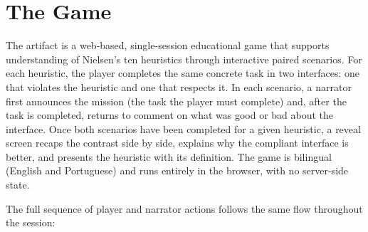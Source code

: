 \section{The Game}
\label{sec:game}


The artifact is a web-based, single-session educational game that supports understanding of Nielsen's ten heuristics through interactive paired scenarios. For each heuristic, the player completes the same concrete task in two interfaces: one that violates the heuristic and one that respects it. In each scenario, a narrator first announces the mission (the task the player must complete) and, after the task is completed, returns to comment on what was good or bad about the interface. Once both scenarios have been completed for a given heuristic, a reveal screen recaps the contrast side by side, explains why the compliant interface is better, and presents the heuristic with its definition. The game is bilingual (English and Portuguese) and runs entirely in the browser, with no server-side state.

The full sequence of player and narrator actions follows the same flow throughout the session:

